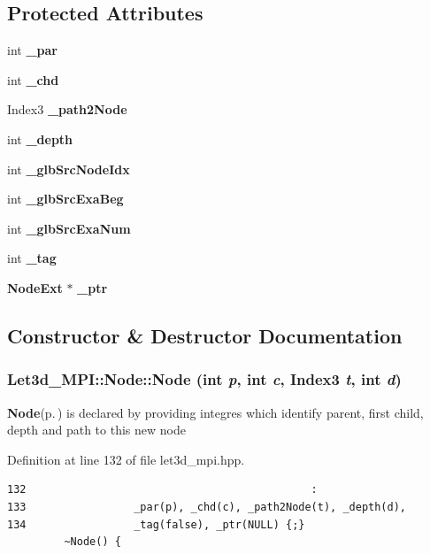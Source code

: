 \subsection*{Protected Attributes}
\begin{CompactItemize}
\item 
int {\bf \_\-par}
\item 
int {\bf \_\-chd}
\item 
Index3 {\bf \_\-path2Node}
\item 
int {\bf \_\-depth}
\item 
int {\bf \_\-glb\-Src\-Node\-Idx}
\item 
int {\bf \_\-glb\-Src\-Exa\-Beg}
\item 
int {\bf \_\-glb\-Src\-Exa\-Num}
\item 
int {\bf \_\-tag}
\item 
{\bf Node\-Ext} $\ast$ {\bf \_\-ptr}
\end{CompactItemize}


\subsection{Constructor \& Destructor Documentation}
\subsubsection{\setlength{\rightskip}{0pt plus 5cm}Let3d\_\-MPI::Node::Node (int {\em p}, int {\em c}, Index3 {\em t}, int {\em d})\hspace{0.3cm}{\tt  [inline]}}\label{classLet3d__MPI_1_1Node_fc1a9b4d57492964c65833ea79c507d5_fc1a9b4d57492964c65833ea79c507d5}


{\bf Node}{\rm (p.\,\pageref{classLet3d__MPI_1_1Node})} is declared by providing integres which identify parent, first child, depth and path to this new node 

Definition at line 132 of file let3d\_\-mpi.hpp.

\footnotesize\begin{verbatim}132                                             :
133                 _par(p), _chd(c), _path2Node(t), _depth(d),
134                 _tag(false), _ptr(NULL) {;}
         ~Node() {
\end{verbatim}\normalsize 


